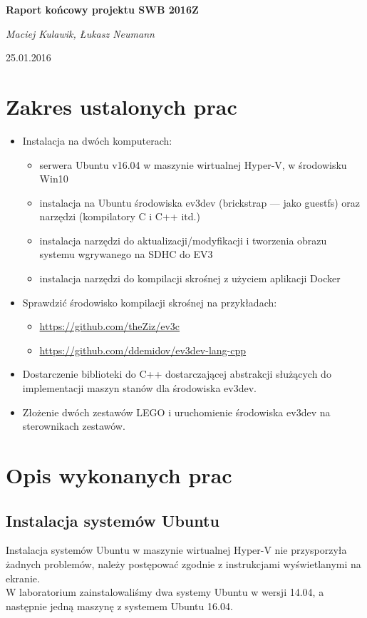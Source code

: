 \documentclass{article}
\begin{document}

\begingroup
    \centering
    \LARGE\textbf{Raport końcowy projektu SWB 2016Z}\\[0.75em]
    \vspace{0.2cm}
    {\large\itshape Maciej Kulawik, Łukasz Neumann\par}
    \vspace{0.5cm}
    {\large 25.01.2016\par}
\endgroup


\section{Zakres ustalonych prac}
\begin{itemize}
    \item Instalacja na dwóch komputerach:
        \begin{itemize}
            \item serwera Ubuntu v16.04 w maszynie wirtualnej Hyper-V, w środowisku Win10
            \item instalacja na Ubuntu środowiska ev3dev (brickstrap --- jako guestfs) oraz narzędzi (kompilatory C i C++ itd.)
            \item instalacja narzędzi do aktualizacji/modyfikacji i tworzenia obrazu systemu wgrywanego na SDHC do EV3
            \item instalacja narzędzi do kompilacji skrośnej z użyciem aplikacji Docker
        \end{itemize}
    \item Sprawdzić środowisko kompilacji skrośnej na przykładach:
        \begin{itemize}
            \item \url{https://github.com/theZiz/ev3c}
            \item \url{https://github.com/ddemidov/ev3dev-lang-cpp}
        \end{itemize}
    \item Dostarczenie biblioteki do C++ dostarczającej abstrakcji służących do
        implementacji maszyn stanów dla środowiska ev3dev.
    \item Złożenie dwóch zestawów LEGO i uruchomienie środowiska ev3dev na
        sterownikach zestawów.
\end{itemize}
\section{Opis wykonanych prac}
\subsection{Instalacja systemów Ubuntu}
Instalacja systemów Ubuntu w maszynie wirtualnej Hyper-V nie przysporzyła
żadnych problemów, należy postępować zgodnie z instrukcjami wyświetlanymi na
ekranie.\\
W laboratorium zainstalowaliśmy dwa systemy Ubuntu w wersji 14.04, a następnie
jedną maszynę z systemem Ubuntu 16.04.
\end{document}

